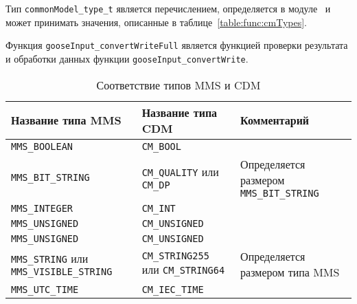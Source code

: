 Тип \lstinline{commonModel_type_t} является перечислением, определяется в модуле \moduleDataStoring\ и может принимать значения, описанные в таблице~\ref{table:func:cmTypes}.

Функция \lstinline{gooseInput_convertWriteFull} является функцией проверки результата и обработки данных функции \lstinline{gooseInput_convertWrite}.

\begin{table}[ht]
    \caption{Соответствие типов MMS и CDM}
    \label{table:func:MmsCdmTypes}
    \begin{tabular}{| >{\raggedright}m{}
                    | >{\raggedright}m{}
                    | >{\raggedright\arraybackslash}m{}|}
        \hline
        \centering Название типа MMS
        & \centering Название типа CDM
        & \centering\arraybackslash Комментарий \\

        \hline
        \lstinline[]$MMS_BOOLEAN$ &
        \lstinline[]$CM_BOOL$ &
        \\

        \hline
        \lstinline[]$MMS_BIT_STRING$ &
        \lstinline[]$CM_QUALITY$ или
        \lstinline[]$CM_DP$ &
        Определяется размером \lstinline[]$MMS_BIT_STRING$
        \\

        \hline
        \lstinline[]$MMS_INTEGER$ &
        \lstinline[]$CM_INT$ &
        \\

        \hline
        \lstinline[]$MMS_UNSIGNED$ &
        \lstinline[]$CM_UNSIGNED$ &
        \\

        \hline
        \lstinline[]$MMS_UNSIGNED$ &
        \lstinline[]$CM_UNSIGNED$ &
        \\

        \hline
        \lstinline[]$MMS_STRING$ или
        \lstinline[]$MMS_VISIBLE_STRING$ &
        \lstinline[]$CM_STRING255$ или
        \lstinline[]$CM_STRING64$ &
        Определяется размером типа MMS
        \\

        \hline
        \lstinline[]$MMS_UTC_TIME$ &
        \lstinline[]$CM_IEC_TIME$ &
        \\

        \hline
    \end{tabular}
\end{table}

